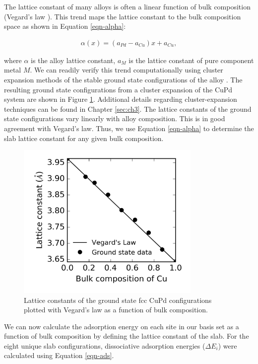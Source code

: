 \documentclass[12pt,oneside]{cmuthesis}
\begin{document}
The lattice constant of many alloys is often a linear function of bulk composition (Vegard's law \cite{denton-1991-vegar-law,bose-1992-elect-struc}). This trend  maps the lattice constant to the bulk composition space as shown in Equation \eqref{eqn-alpha}:

\begin{eqnarray}
\alpha(x) = (a_{Pd} - a_{Cu}) x + a_{Cu} \label{eqn-alpha},
\end{eqnarray}

\noindent
where \(\alpha\) is the alloy lattice constant, \(a_{M}\) is the lattice constant of pure component metal \(M\). We can readily verify this trend computationally using cluster expansion methods of the stable ground state configurations of the alloy \cite{walle-2002-self-monte,walle-2002-autom}. The resulting ground state configurations from a cluster expansion of the CuPd system are shown in Figure \ref{fig-vegard}. Additional details regarding cluster-expansion techniques can be found in Chapter \ref{sec:ch3}. The lattice constants of the ground state configurations vary linearly with alloy composition. This is in good agreement with Vegard's law. Thus, we use Equation \eqref{eqn-alpha} to determine the slab lattice constant for any given bulk composition.

\begin{figure}[h]
\centering
\includegraphics[width=3.5in]{./images/vegard.png}
\caption{Lattice constants of the ground state fcc CuPd configurations plotted with Vegard's law as a function of bulk composition. \label{fig-vegard}}
\end{figure}

We can now calculate the adsorption energy on each site in our basis set as a function of bulk composition by defining the lattice constant of the slab. For the eight unique slab configurations, dissociative adsorption energies (\(\Delta E_{i}\)) were calculated using Equation \eqref{eqn-ads}.
\end{document}
